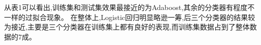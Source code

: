 从表1可以看出,训练集和测试集效果最接近的为Adaboost,其余的分类器有程度不一样的过拟合现象。
在整体上,Logistic回归明显略逊一筹,后三个分类器的结果较为接近,主要是三个分类器在训练集上都有良好的表现,而训练集数据占到了整体数据的7成。

